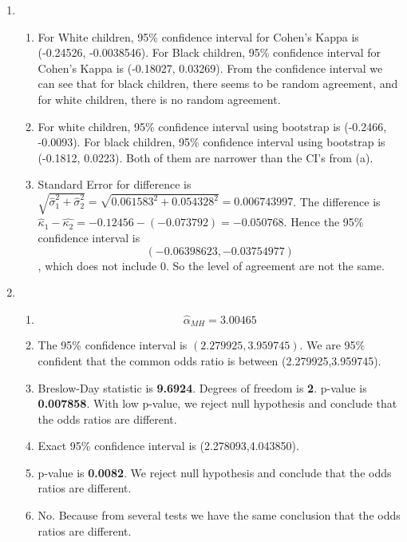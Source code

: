 \documentclass{article}
\begin{document}
\begin{enumerate}[leftmargin = 0 em, label = \arabic*., font = \bfseries]
\begin{enumerate}
		\item 

		\item 
	\end{enumerate}
	\item
	\begin{enumerate}
	\item 
		For White children, 95\% confidence interval for Cohen's Kappa is (-0.24526, -0.0038546). For Black children, 95\% confidence interval for Cohen's Kappa is (-0.18027, 0.03269). From the confidence interval we can see that for black children, there seems to be random agreement, and for white children, there is no random agreement.
	
		\item 
		For white children, 95\% confidence interval using bootstrap is (-0.2466, -0.0093). For black children, 95\% confidence interval using bootstrap is (-0.1812,  0.0223). Both of them are narrower than the CI's from (a).
	
		\item 
		Standard Error for difference is $\sqrt{\hat{\sigma}_1^2 + \hat{\sigma}_2^2} = \sqrt{0.061583^2 +  0.054328^2} =  0.006743997$. The difference is $\hat{\kappa}_1 - \hat{\kappa_2} = -0.12456 - (-0.073792) = -0.050768$. Hence the 95\% confidence interval is 
		\[(-0.06398623, -0.03754977)\],
		which does not include 0. So the level of agreement are not the same.
		\end{enumerate}

		\item 
		\begin{enumerate}
			\item 
			\[\hat{\alpha}_{MH} = 3.00465\]

			\item 
			The 95\% confidence interval is $(2.279925,3.959745)$. We are 95\% confident that the common odds ratio is between (2.279925,3.959745).

			\item 
			Breslow-Day statistic is \textbf{9.6924}. Degrees of freedom is \textbf{2}. p-value is \textbf{0.007858}. With low p-value, we reject null hypothesis and conclude that the odds ratios are different.

			\item 
			Exact 95\% confidence interval is (2.278093,4.043850). 

			\item 
			p-value is \textbf{0.0082}. We reject null hypothesis and conclude that the odds ratios are different.

			\item 
			No. Because from several tests we have the same conclusion that the odds ratios are different.
		\end{enumerate}
		
 	\end{enumerate}





	
	
	
	
\end{document}
